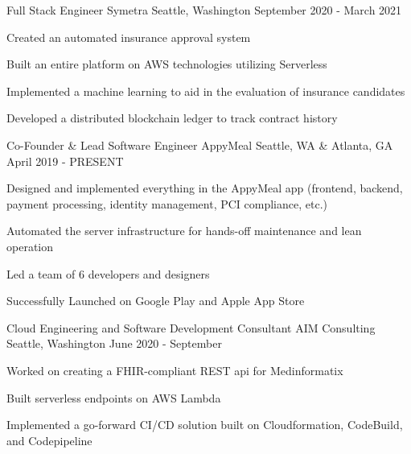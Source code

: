 \begin{cventries}

\cventry
{Full Stack Engineer} %
{Symetra} %
{Seattle, Washington} %
{September 2020 - March 2021} %
{ %
\begin{cvitems}
\item {Created an automated insurance approval system}
\item {Built an entire platform on AWS technologies utilizing Serverless}
\item {Implemented a machine learning to aid in the evaluation of insurance candidates}
\item {Developed a distributed blockchain ledger to track contract history}
\end{cvitems}
}


\cventry
{Co-Founder \& Lead Software Engineer} %
{AppyMeal} %
{Seattle, WA \& Atlanta, GA} %
{April 2019 - PRESENT} %
{ %
\begin{cvitems}
\item {Designed and implemented everything in the AppyMeal app (frontend, backend, payment processing, \newline identity management, PCI compliance, etc.)}
\item {Automated the server infrastructure for hands-off maintenance and lean operation}
\item {Led a team of 6 developers and designers}
\item {Successfully Launched on Google Play and Apple App Store}
\end{cvitems}
}


\cventry
{Cloud Engineering and Software Development Consultant} %
{AIM Consulting} %
{Seattle, Washington} %
{June 2020 - September} %
{ %
\begin{cvitems}
\item {Worked on creating a FHIR-compliant REST api for Medinformatix}
\item {Built serverless endpoints on AWS Lambda}
\item {Implemented a go-forward CI/CD solution built on Cloudformation, CodeBuild, and Codepipeline}
\end{cvitems}
}


\end{cventries}
